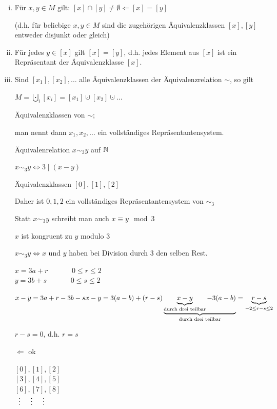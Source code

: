 
\begin{enumerate}[i)]
\item Für $x,y \in M$ gilt:
$[x]\cap[y]\neq\emptyset \Longleftarrow[x] = [y]$

(d.h. für beliebige $x,y \in M$ sind die zugehörigen Äquivalenzklassen $[x],[y]$ entweder disjunkt oder gleich)

\item Für jedes $y\in[x]$ gilt $[x] = [y]$, d.h. jedes Element aus $[x]$ ist ein Repräsentant der Äquivalenzklasse $[x]$.

\item Sind $[x_1], [x_2],\ldots$ alle Äquivalenzklassen der Äquivalenzrelation $\sim$, so gilt

$M = \bigcupdot\limits_{i}[x_i] = [x_1] \cupdot [x_2] \cupdot \ldots$

Äquivalenzklassen von $\sim$;

man nennt dann $x_1,x_2,\ldots$ ein vollständiges Repräsentantensystem.

\Bsp

	Äquivalenrelation $x\sim_3 y$ auf $\mathbb{N}$
	
	$x\sim_3 y \Longleftrightarrow 3\mid (x-y)$
	
	Äquivalenzklassen $[0],[1],[2]$
	
	Daher ist $0,1,2$ ein vollständiges Repräsentantensystem von $\sim_3$
	
	Statt $x\sim_3y$ schreibt man auch $x \equiv y \mod 3$
	
	{\flqq $x$ ist kongruent zu $y$ modulo $3$\frqq}
	
	$x\sim_3y \Longleftrightarrow x\text{ und }y$ haben bei Division durch $3$ den selben Rest.
	
	$x=3a+r \hspace{40pt} 0\leq r \leq 2$\\
	$y=3b+s \hspace{40pt} 0\leq s \leq 2$
	
	$x-y = 3a+r-3b-s\\
	x-y = 3(a-b)+(r-s)\\
	\underbrace{\underbrace{x-y}_\text{durch drei teilbar}-3(a-b)}_\text{durch drei teilbar}=\underbrace{r-s}_{-2\leq r-s \leq 2}$
	                             
	$r-s = 0$, d.h. $r=s$
	
	$\Leftarrow$ ok
	
	$[0],[1],[2]$\\
	$[3],[4],[5]$\\
	$[6],[7],[8]$\\
	$\hspace*{5pt}\vdots\hspace*{14pt}\vdots\hspace*{14pt}\vdots$
\end{enumerate}

